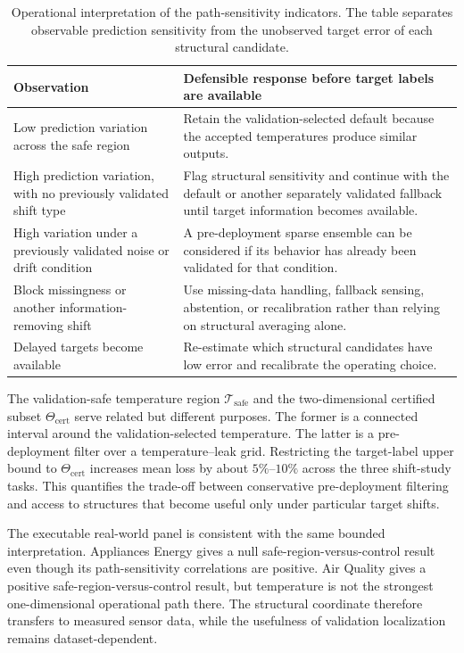 \documentclass[11pt,a4paper]{article}
\begin{document}
\begin{table}[H]
\centering
\caption{Operational interpretation of the path-sensitivity indicators. The table separates observable prediction sensitivity from the unobserved target error of each structural candidate.}
\label{tab:operational_interpretation}
\footnotesize
\begin{tabularx}{\textwidth}{>{\raggedright\arraybackslash}p{}>{\raggedright\arraybackslash}X}
\toprule
Observation & Defensible response before target labels are available \\
\midrule
Low prediction variation across the safe region & Retain the validation-selected default because the accepted temperatures produce similar outputs. \\
High prediction variation, with no previously validated shift type & Flag structural sensitivity and continue with the default or another separately validated fallback until target information becomes available. \\
High variation under a previously validated noise or drift condition & A pre-deployment sparse ensemble can be considered if its behavior has already been validated for that condition. \\
Block missingness or another information-removing shift & Use missing-data handling, fallback sensing, abstention, or recalibration rather than relying on structural averaging alone. \\
Delayed targets become available & Re-estimate which structural candidates have low error and recalibrate the operating choice. \\
\bottomrule
\end{tabularx}
\end{table}

The validation-safe temperature region $\mathcal T_{\mathrm{safe}}$ and the two-dimensional certified subset $\Theta_{\mathrm{cert}}$ serve related but different purposes. The former is a connected interval around the validation-selected temperature. The latter is a pre-deployment filter over a temperature--leak grid. Restricting the target-label upper bound to $\Theta_{\mathrm{cert}}$ increases mean loss by about $5\%$--$10\%$ across the three shift-study tasks. This quantifies the trade-off between conservative pre-deployment filtering and access to structures that become useful only under particular target shifts.

The executable real-world panel is consistent with the same bounded interpretation. Appliances Energy gives a null safe-region-versus-control result even though its path-sensitivity correlations are positive. Air Quality gives a positive safe-region-versus-control result, but temperature is not the strongest one-dimensional operational path there. The structural coordinate therefore transfers to measured sensor data, while the usefulness of validation localization remains dataset-dependent.
\end{document}
